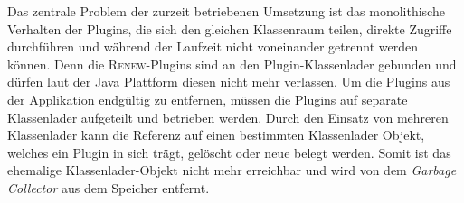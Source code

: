 	Das zentrale Problem der zurzeit betriebenen Umsetzung ist das monolithische Verhalten der Plugins, die sich den gleichen Klassenraum teilen, direkte Zugriffe durchführen und während der Laufzeit nicht voneinander getrennt werden können. Denn die \textsc{Renew}-Plugins sind an den Plugin-Klassenlader gebunden und dürfen laut der Java Plattform diesen nicht mehr verlassen. \newline
	Um die Plugins aus der Applikation endgültig zu entfernen, müssen die Plugins auf separate Klassenlader aufgeteilt und betrieben werden. Durch den Einsatz von mehreren Klassenlader kann die Referenz auf einen bestimmten Klassenlader Objekt, welches ein Plugin in sich trägt, gelöscht oder neue belegt werden. Somit ist das ehemalige Klassenlader-Objekt nicht mehr erreichbar und wird von dem \textit{Garbage Collector} aus dem Speicher entfernt.\bigbreak 

